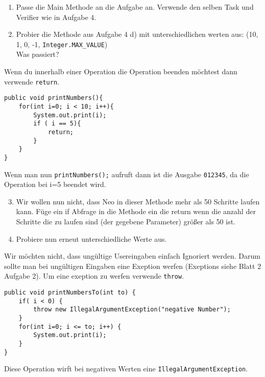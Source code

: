 
\begin{enumerate}
	\item
		Passe die Main Methode an die Aufgabe an. Verwende den selben Task und Verifier wie in Aufgabe 4.

	\item
		Probier die Methode aus Aufgabe 4 d) mit unterschiedlichen werten aus: (10, 1, 0, -1, \lstinline{Integer.MAX_VALUE}) \\
		Was passiert?
\end{enumerate}

	
\begin{Infobox}[Return]
	Wenn du innerhalb einer Operation die Operation beenden möchtest dann verwende \lstinline{return}.

	\begin{lstlisting}
public void printNumbers(){
    for(int i=0; i < 10; i++){
        System.out.print(i);
        if ( i == 5){
            return;
        }
    }
}
	\end{lstlisting}

	Wenn man nun \lstinline{printNumbers();} aufruft dann ist die Ausgabe \lstinline{012345}, da die Operation bei i=5 beendet wird.
\end{Infobox}


\begin{enumerate}\setcounter{enumi}{2}
	\item
		Wir wollen nun nicht, dass Neo in dieser Methode mehr als 50 Schritte laufen kann. Füge ein if Abfrage in die Methode ein die return wenn die anzahl der Schritte die zu laufen sind (der gegebene Parameter) größer als 50 ist.

	\item
		Probiere nun erneut unterschiedliche Werte aus.
\end{enumerate}


\begin{Infobox}
	Wir möchten nicht, dass ungültige Usereingaben einfach Ignoriert werden. 
	Darum sollte man bei ungültigen Eingaben eine Exeption werfen (Exeptions siehe Blatt 2 Aufgabe 2).
	Um eine exeption zu werfen verwende \lstinline{throw}.

	\begin{lstlisting}
public void printNumbersTo(int to) {
    if( i < 0) {
        throw new IllegalArgumentException("negative Number");	
    }
    for(int i=0; i <= to; i++) {
        System.out.print(i);
    }
}
	\end{lstlisting}
	
	Diese Operation wirft bei negativen Werten eine \lstinline{IllegalArgumentException}.
\end{Infobox}


